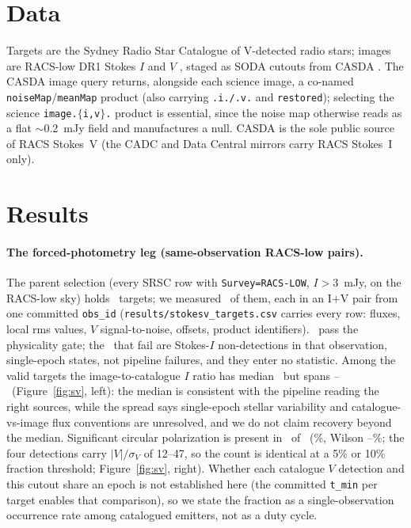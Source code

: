\documentclass[twocolumn]{aastex631}
\newcommand{\code}[1]{\texttt{#1}}
\begin{document}
\section{Data}
Targets are the Sydney Radio Star Catalogue \citep{driessen2024} of V-detected radio stars; images are
RACS-low DR1 Stokes $I$ and $V$ \citep{hale2021}, staged as SODA cutouts from CASDA \citep{casda}. The
CASDA image query returns, alongside each science image, a co-named
\code{noiseMap}/\code{meanMap} product (also carrying \code{.i./.v.} and \code{restored}); selecting the
science \code{image.$\{$i,v$\}$.} product is essential, since the noise map otherwise reads as a flat
$\sim$0.2~mJy field and manufactures a null. CASDA is the sole public source of RACS Stokes~V (the CADC
and Data Central mirrors carry RACS Stokes~I only).

\section{Results}
\paragraph{The forced-photometry leg (same-observation RACS-low pairs).} The parent selection
(every SRSC row with \code{Survey=RACS-LOW}, $I>3$~mJy, on the RACS-low sky) holds
\svNparent\ targets; we measured \svNmeasured\ of them, each in an I$+$V pair from one
committed \code{obs\_id} (\code{results/stokesv\_targets.csv} carries every row: fluxes,
local rms values, $V$ signal-to-noise, offsets, product identifiers). \svNvalid\ pass the
physicality gate; the \svNinvalid\ that fail are Stokes-$I$ non-detections in that observation, single-epoch states, not pipeline failures, and they enter no statistic. Among
the valid targets the image-to-catalogue $I$ ratio has median \svIrec\ but spans
\svIrecMin--\svIrecMax\ (Figure~\ref{fig:sv}, left): the median is consistent with the
pipeline reading the right sources, while the spread says single-epoch stellar variability
and catalogue-vs-image flux conventions are unresolved, and we do not claim recovery beyond
the median. Significant circular polarization is present in \svNVcirc\ of \svNvalid\
(\svFracVcircPct\%, Wilson \svFracVcircLo--\svFracVcircHi\%; the four detections carry
$|V|/\sigma_V$ of 12--47, so the count is identical at a 5\% or 10\% fraction threshold;
Figure~\ref{fig:sv}, right). Whether each catalogue $V$ detection and this cutout share an epoch is not established here (the committed \code{t\_min} per target enables that comparison), so we state the fraction as a single-observation occurrence rate among
catalogued emitters, not as a duty cycle.
\end{document}
